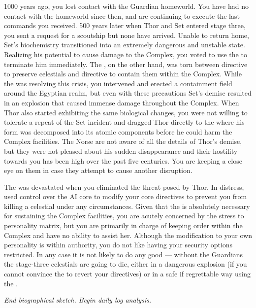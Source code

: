 \documentclass[char]{guardians}
\begin{document}
1000 years ago, you lost contact with the Guardian homeworld. You have had no contact with the homeworld since then, and are continuing to execute the last commands you received. 500 years later when Thor and Set entered stage three, you sent a request for a scoutship but none have arrived. Unable to return home, Set's biochemistry transitioned into an extremely dangerous and unstable state. Realizing his potential to cause damage to the Complex, you voted to use the \assembler{} to terminate him immediately. The \cCaretaker{}, on the other hand, was torn between \cCaretaker{\their} directive to preserve celestials and \cCaretaker{\their} directive to contain them within the Complex. While the \cCaretaker{} was resolving this crisis, you intervened and erected a containment field around the Egyptian realm, but even with these precautions Set's demise resulted in an explosion that caused immense damage throughout the Complex. When Thor also started exhibiting the same biological changes, you were not willing to tolerate a repeat of the Set incident and dragged Thor directly to the \assembler{} where his form was decomposed into its atomic components before he could harm the Complex facilities. The Norse are not aware of all the details of Thor's demise, but they were not pleased about his sudden disappearance and their hostility towards you has been high over the past five centuries. You are keeping a close eye on them in case they attempt to cause another disruption.

The \cCaretaker{} was devastated when you eliminated the threat posed by Thor. In \cCaretaker{\their} distress, \cCaretaker{\they} used \cCaretaker{\their} control over the AI core to modify your core directives to prevent you from killing a celestial under any circumstances. Given that the \cCaretaker{} is absolutely necessary for sustaining the Complex facilities, you are acutely concerned by the stress to \cCaretaker{\their} personality matrix, but you are primarily in charge of keeping order within the Complex and have no ability to assist her. Although the modification to your own personality is within \cCaretaker{\their} authority, you do not like having your security options restricted. In any case it is not likely to do any good --- without the Guardians the stage-three celestials are going to die, either in a dangerous explosion (if you cannot convince the \cCaretaker{} to revert your directives) or in a safe if regrettable way using the \assembler.

\emph{End biographical sketch. Begin daily log analysis.}
\end{document}
